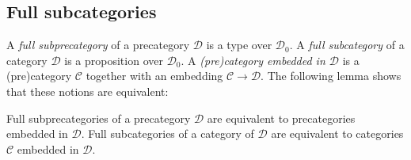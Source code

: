 \documentclass[reqno]{amsart}
\theoremstyle{definition}
\theoremstyle{remark}
\newcommand{\scat}[1]{\mathcal{#1}}
\newcommand{\ob}[1]{#1_0}
\numberwithin{figure}{section}
\begin{document}
\subsection{Full subcategories}

A \emph{full subprecategory} of a precategory $\scat{D}$ is a type over $\ob{\scat{D}}$.
A \emph{full subcategory} of a category $\scat{D}$ is a proposition over $\ob{\scat{D}}$.
A \emph{(pre)category embedded in $\scat{D}$} is a (pre)category $\scat{C}$ together with an embedding $\scat{C} \to \scat{D}$.
The following lemma shows that these notions are equivalent:

\begin{lem}
Full subprecategories of a precategory $\scat{D}$ are equivalent to precategories embedded in $\scat{D}$.
Full subcategories of a category of $\scat{D}$ are equivalent to categories $\scat{C}$ embedded in $\scat{D}$.
\end{lem}
\end{document}
